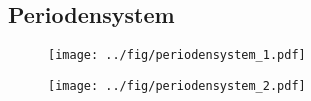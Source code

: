 \begin{appendices}
        \clearpage
        \chapter{Periodensystem}
        
        \begin{figure}
                \centering
                \texttt{[image: ../fig/periodensystem\_1.pdf]}
                \label{fig:persys}
        \end{figure}        

        \begin{figure}
                \centering
                \texttt{[image: ../fig/periodensystem\_2.pdf]}
        \end{figure}

\end{appendices}

